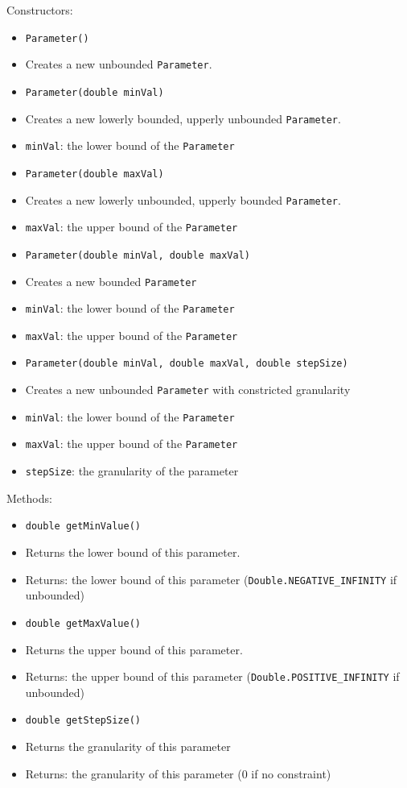 \documentclass[parskip=full,11pt]{scrartcl}
\begin{document}
Constructors:
\begin{itemize}\itemsep -10pt
	\item \texttt{Parameter()}
	\item[] Creates a new unbounded \texttt{Parameter}.
	
	\item \texttt{Parameter(double minVal)}
	\item[] Creates a new lowerly bounded, upperly unbounded \texttt{Parameter}.
	\item[] \texttt{minVal}: the lower bound of the \texttt{Parameter}
	\item \texttt{Parameter(double maxVal)}
	\item[] Creates a new lowerly unbounded, upperly bounded \texttt{Parameter}.
	\item[] \texttt{maxVal}: the upper bound of the \texttt{Parameter}
	\item \texttt{Parameter(double minVal, double maxVal)}
	\item[] Creates a new bounded \texttt{Parameter}
	\item[] \texttt{minVal}: the lower bound of the \texttt{Parameter}
	\item[] \texttt{maxVal}: the upper bound of the \texttt{Parameter}
	\item \texttt{Parameter(double minVal, double maxVal, double stepSize)}
	\item[] Creates a new unbounded \texttt{Parameter} with constricted granularity
\item[] \texttt{minVal}: the lower bound of the \texttt{Parameter}
	\item[] \texttt{maxVal}: the upper bound of the \texttt{Parameter}
	\item[] \texttt{stepSize}: the granularity of the parameter
	
\end{itemize}

Methods:

\begin{itemize}\itemsep -10pt
	\item \texttt{double getMinValue()}
	\item[] Returns the lower bound of this parameter.
	\item[] Returns: the lower bound of this parameter (\texttt{Double.NEGATIVE\_INFINITY} if unbounded)
	\item \texttt{double getMaxValue()}
	\item[] Returns the upper bound of this parameter.
	\item[] Returns: the upper bound of this parameter (\texttt{Double.POSITIVE\_INFINITY} if unbounded)
	\item \texttt{double getStepSize()}
	\item[] Returns the granularity of this parameter
	\item[]Returns: the granularity of this parameter (\(0\) if no constraint)
\end{itemize}
\end{document}
